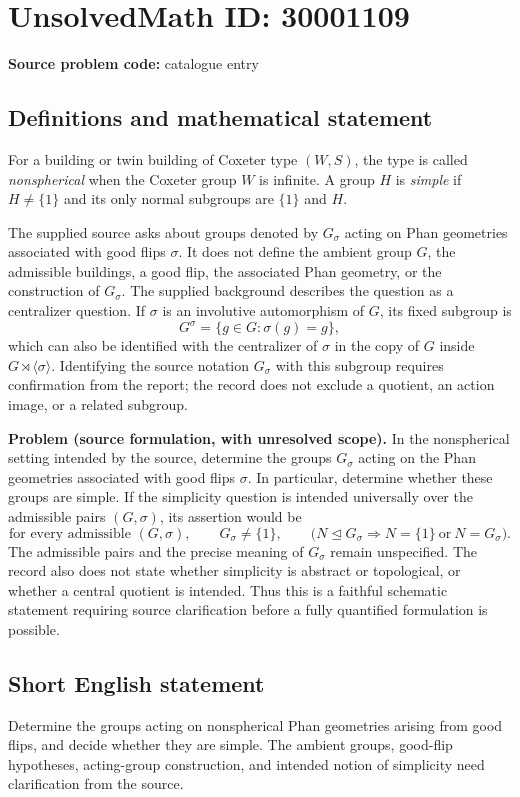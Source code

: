 \documentclass[11pt]{article}
\begin{document}
\section*{UnsolvedMath ID: 30001109}
\textbf{Source problem code:} catalogue entry
\subsection{Definitions and mathematical statement}
For a building or twin building of Coxeter type \((W,S)\), the type is called \emph{nonspherical} when the Coxeter group \(W\) is infinite. A group \(H\) is \emph{simple} if \(H\neq\{1\}\) and its only normal subgroups are \(\{1\}\) and \(H\).

The supplied source asks about groups denoted by \(G_\sigma\) acting on Phan geometries associated with good flips \(\sigma\). It does not define the ambient group \(G\), the admissible buildings, a good flip, the associated Phan geometry, or the construction of \(G_\sigma\). The supplied background describes the question as a centralizer question. If \(\sigma\) is an involutive automorphism of \(G\), its fixed subgroup is
\[
G^\sigma=\{g\in G:\sigma(g)=g\},
\]
which can also be identified with the centralizer of \(\sigma\) in the copy of \(G\) inside \(G\rtimes\langle\sigma\rangle\). Identifying the source notation \(G_\sigma\) with this subgroup requires confirmation from the report; the record does not exclude a quotient, an action image, or a related subgroup.

\textbf{Problem (source formulation, with unresolved scope).} In the nonspherical setting intended by the source, determine the groups \(G_\sigma\) acting on the Phan geometries associated with good flips \(\sigma\). In particular, determine whether these groups are simple. If the simplicity question is intended universally over the admissible pairs \((G,\sigma)\), its assertion would be
\[
\text{for every admissible }(G,\sigma),\qquad
G_\sigma\neq\{1\},\qquad
\bigl(N\trianglelefteq G_\sigma\Longrightarrow
N=\{1\}\ \text{or}\ N=G_\sigma\bigr).
\]
The admissible pairs and the precise meaning of \(G_\sigma\) remain unspecified. The record also does not state whether simplicity is abstract or topological, or whether a central quotient is intended. Thus this is a faithful schematic statement requiring source clarification before a fully quantified formulation is possible.
\subsection{Short English statement}
Determine the groups acting on nonspherical Phan geometries arising from good flips, and decide whether they are simple. The ambient groups, good-flip hypotheses, acting-group construction, and intended notion of simplicity need clarification from the source.
\end{document}
